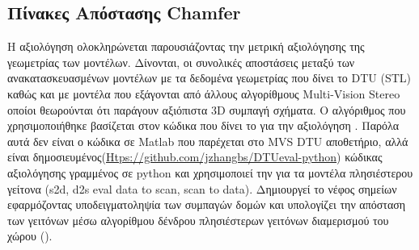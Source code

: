 \subsection{Πίνακες Απόστασης Chamfer}
H αξιολόγηση ολοκληρώνεται παρουσιάζοντας την μετρική αξιολόγησης της γεωμετρίας των  μοντέλων. Δίνονται, οι συνολικές αποστάσεις  μεταξύ των ανακατασκευασμένων  μοντέλων με τα δεδομένα γεωμετρίας που δίνει το DTU (STL) καθώς και με  μοντέλα που εξάγονται από άλλους αλγορίθμους Multi-Vision Stereo οποίοι θεωρούνται ότι παράγουν αξιόπιστα 3D συμπαγή σχήματα. Ο αλγόριθμος που χρησιμοποιήθηκε βασίζεται στον κώδικα που δίνει το  για την αξιολόγηση \cite{Jensen14a}. Παρόλα αυτά δεν είναι ο  κώδικα σε Matlab που παρέχεται στο MVS DTU αποθετήριο, αλλά είναι δημοσιευμένος(\href{Htps://github.com/jzhangbs/DTUeval-python}{Htps://github.com/jzhangbs/DTUeval-python}) κώδικας αξιολόγησης γραμμένος  σε python και χρησιμοποιεί την  για τα μοντέλα πλησιέστερου γείτονα (s2d, d2s eval data to scan, scan to data). Δημιουργεί το νέφος σημείων εφαρμόζοντας υποδειγματοληψία των συμπαγών δομών και υπολογίζει την απόσταση των γειτόνων μέσω αλγορίθμου δένδρου πλησιέστερων γειτόνων διαμερισμού του χώρου (). 

